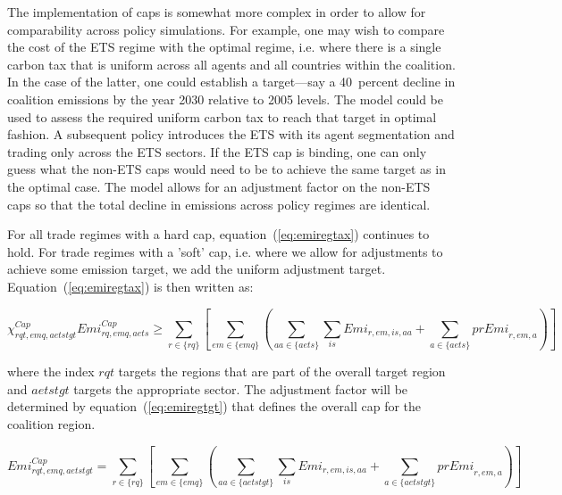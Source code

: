 \documentclass[11pt,letterpaper]{report}
\begin{document}
The implementation of caps is somewhat more complex in order to allow for
comparability across policy simulations. For example, one may wish to compare
the cost of the ETS regime with the optimal regime, i.e. where there is a
single carbon tax that is uniform across all agents and all countries within
the coalition. In the case of the latter, one could establish a target---say
a 40~percent decline in coalition emissions by the year 2030 relative to 2005 levels.
The model could be used to assess the required uniform carbon tax to reach
that target in optimal fashion. A subsequent policy introduces the ETS with
its agent segmentation and trading only across the ETS sectors. If the ETS cap
is binding, one can only guess what the non-ETS caps would need to be to
achieve the same target as in the optimal case. The model allows for an adjustment
factor on the non-ETS caps so that the total decline in emissions across
policy regimes are identical.

For all trade regimes with a hard cap, equation~(\ref{eq:emiregtax}) continues
to hold. For trade regimes with a 'soft' cap, i.e. where we allow for adjustments
to achieve some emission target, we add the uniform adjustment target.
Equation~(\ref{eq:emiregtax}) is then written as:

\begin{equation}
\label{eq:emiregtaxbis}
\chi^{\mathit{Cap}}_{\mathit{rqt},\mathit{emq},\mathit{aetstgt}}
\mathit{Emi}^{\mathit{Cap}}_{\mathit{rq},\mathit{emq},\mathit{aets}}
\ge
\sum_{r \in \{ \mathit{rq}\}}
{\left[
\sum_{\mathit{em} \in \{\mathit{emq}\}}
\left( \sum_{\mathit{aa} \in \{\mathit{aets}\}}
\sum_{\mathit{is}} {\mathit{Emi}_{r,\mathit{em},\mathit{is},\mathit{aa}}}
 +
\sum_{\mathit{a} \in \{\mathit{aets}\}}{\mathit{prEmi}_{r,\mathit{em},a}}
\right)
\right]}
\end{equation}

\noindent where the index $\mathit{rqt}$ targets the regions that are part of the overall target region
and $\mathit{aetstgt}$ targets the appropriate sector. The adjustment factor will be determined
by equation~(\ref{eq:emiregtgt}) that defines the overall cap for the coalition region.

\begin{equation}
\label{eq:emiregtgt}
\mathit{Emi}^{\mathit{Cap}}_{\mathit{rqt},\mathit{emq},\mathit{aetstgt}}
=
\sum_{r \in \{ \mathit{rq}\}}
{\left[
\sum_{\mathit{em} \in \{\mathit{emq}\}}
\left( \sum_{\mathit{aa} \in \{\mathit{aetstgt}\}}
\sum_{\mathit{is}} {\mathit{Emi}_{r,\mathit{em},\mathit{is},\mathit{aa}}}
 +
\sum_{\mathit{a} \in \{\mathit{aetstgt}\}}{\mathit{prEmi}_{r,\mathit{em},a}}
\right)
\right]}
\end{equation}
\end{document}
